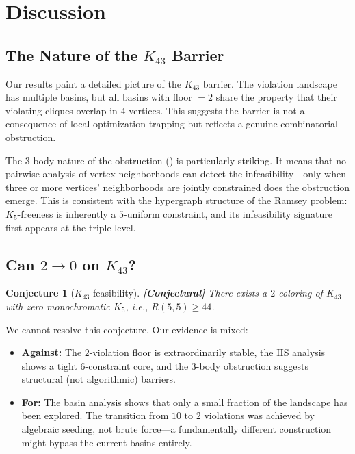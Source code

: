 \documentclass[12pt,a4paper]{article}
\newcommand{\conjectural}[1]{\textcolor{conjectural}{\textbf{[Conjectural]}} #1}
\newtheorem{conjecture}[theorem]{Conjecture}
\theoremstyle{definition}
\theoremstyle{remark}
\newcommand{\Kn}[1]{K_{#1}}
\newcommand{\Rnum}[2]{R(#1,#2)}
\begin{document}
\section{Discussion}\label{sec:discussion}

\subsection{The Nature of the $\Kn{43}$ Barrier}

Our results paint a detailed picture of the $\Kn{43}$ barrier.  The violation landscape has multiple basins, but all basins with floor $= 2$ share the property that their violating cliques overlap in $4$ vertices.  This suggests the barrier is not a consequence of local optimization trapping but reflects a genuine combinatorial obstruction.

The $3$-body nature of the obstruction () is particularly striking.  It means that no pairwise analysis of vertex neighborhoods can detect the infeasibility---only when three or more vertices' neighborhoods are jointly constrained does the obstruction emerge.  This is consistent with the hypergraph structure of the Ramsey problem: $K_5$-freeness is inherently a $5$-uniform constraint, and its infeasibility signature first appears at the triple level.

\subsection{Can $2 \to 0$ on $\Kn{43}$?}

\begin{conjecture}[$\Kn{43}$ feasibility]\label{conj:k43}
\conjectural{There exists a $2$-coloring of $\Kn{43}$ with zero monochromatic $K_5$, i.e., $\Rnum{5}{5} \ge 44$.}
\end{conjecture}

We cannot resolve this conjecture.  Our evidence is mixed:
\begin{itemize}[nosep]
    \item \textbf{Against:} The $2$-violation floor is extraordinarily stable, the IIS analysis shows a tight $6$-constraint core, and the $3$-body obstruction suggests structural (not algorithmic) barriers.
    \item \textbf{For:} The basin analysis shows that only a small fraction of the landscape has been explored.  The transition from $10$ to $2$ violations was achieved by algebraic seeding, not brute force---a fundamentally different construction might bypass the current basins entirely.
\end{itemize}
\end{document}
